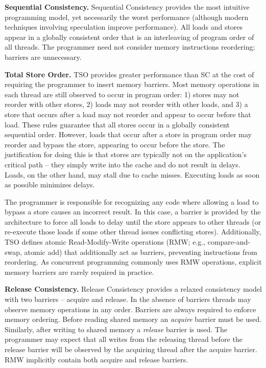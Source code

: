 \textbf{Sequential Consistency.}
Sequential Consistency \cite{Lamport79} provides the most intuitive programming model, yet necessarily the worst performance (although modern techniques involving speculation improve performance).
All loads and stores appear in a globally consistent order that is an interleaving of program order of all threads.
The programmer need not consider memory instructions reordering; barriers are unnecessary.

\textbf{Total Store Order.}
TSO \cite{SparcManualV8} provides greater performance than SC at the cost of requiring the programmer to insert memory barriers.
Most memory operations in each thread are still observed to occur in program order: 1) stores may not reorder with other stores, 2) loads may not reorder with other loads, and 3) a store that occurs after a load may not reorder and appear to occur before that load.
These rules guarantee that all stores occur in a globally consistent sequential order.
However, loads that occur after a store in program order may reorder and bypass the store, appearing to occur before the store.
The justification for doing this is that stores are typically not on the application's critical path -- they simply write into the cache and do not result in delays.
Loads, on the other hand, may stall due to cache misses.
Executing loads as soon as possible minimizes delays.

The programmer is responsible for recognizing any code where allowing a load to bypass a store causes an incorrect result.
In this case, a barrier is provided by the architecture to force all loads to delay until the store appears to other threads (or re-execute those loads if some other thread issues conflicting stores).
Additionally, TSO defines atomic Read-Modify-Write operations (RMW; e.g., compare-and-swap, atomic add) that additionally act as barriers, preventing instructions from reordering.
As concurrent programming commonly uses RMW operations, explicit memory barriers are rarely required in practice.

\textbf{Release Consistency.}
Release Consistency \cite{GharachorlooLenoski90} provides a relaxed consistency model with two barriers -- acquire and release.
In the absence of barriers threads may observe memory operations in any order.
Barriers are always required to enforce memory ordering.
Before reading shared memory an \emph{acquire} barrier must be used.
Similarly, after writing to shared memory a \emph{release} barrier is used.
The programmer may expect that all writes from the releasing thread before the release barrier will be observed by the acquiring thread after the acquire barrier.
RMW implicitly contain both acquire and release barriers.

